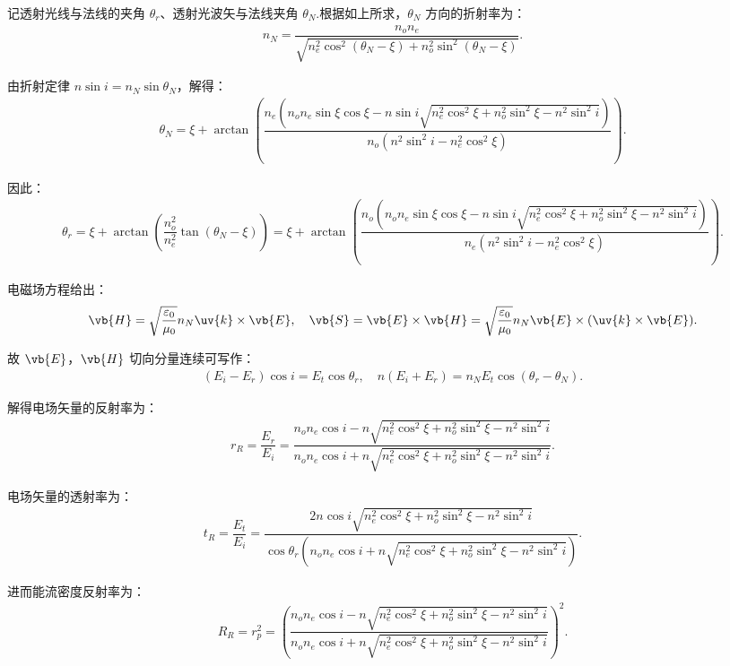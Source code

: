 记透射光线与法线的夹角 \(\theta_r\)、透射光波矢与法线夹角 \(\theta_N\).根据如上所求，\(\theta_N\) 方向的折射率为：
\begin{align*}
	n_N = \dfrac{n_o n_e}{\sqrt{n_e^2 \cos^2(\theta_N - \xi) + n_o^2 \sin^2(\theta_N - \xi)}}.
\end{align*}

由折射定律 \(n \sin i = n_N \sin \theta_N\)，解得：
\begin{align*}
	\theta_N = \xi + \arctan\left( \dfrac{n_e \left( n_o n_e \sin\xi \cos\xi - n \sin i \sqrt{n_e^2 \cos^2\xi + n_o^2 \sin^2\xi - n^2 \sin^2 i} \right)}{n_o \left( n^2 \sin^2 i - n_e^2 \cos^2\xi \right)} \right).
\end{align*}

因此：
\begin{align*}
	\theta_r = \xi + \arctan\left( \dfrac{n_o^2}{n_e^2} \tan(\theta_N - \xi) \right) = \xi + \arctan\left( \dfrac{n_o \left( n_o n_e \sin\xi \cos\xi - n \sin i \sqrt{n_e^2 \cos^2\xi + n_o^2 \sin^2\xi - n^2 \sin^2 i} \right)}{n_e \left( n^2 \sin^2 i - n_e^2 \cos^2\xi \right)} \right).
\end{align*}

电磁场方程给出：
\begin{align*}
	\vb{H} = \sqrt{\dfrac{\varepsilon_0}{\mu_0}} n_N \uv{k} \times \vb{E}, \quad \vb{S} = \vb{E} \times \vb{H} = \sqrt{\dfrac{\varepsilon_0}{\mu_0}} n_N \vb{E} \times (\uv{k} \times \vb{E}).
\end{align*}

故 \(\vb{E}\)，\(\vb{H}\) 切向分量连续可写作：
\begin{align*}
	(E_i - E_r) \cos i = E_t \cos\theta_r, \quad n (E_i + E_r) = n_N E_t \cos(\theta_r - \theta_N).
\end{align*}

解得电场矢量的反射率为：
\begin{align*}
	r_R = \dfrac{E_r}{E_i} = \dfrac{n_o n_e \cos i - n \sqrt{n_e^2 \cos^2\xi + n_o^2 \sin^2\xi - n^2 \sin^2 i}}{n_o n_e \cos i + n \sqrt{n_e^2 \cos^2\xi + n_o^2 \sin^2\xi - n^2 \sin^2 i}}.
\end{align*}

电场矢量的透射率为：
\begin{align*}
	t_R = \dfrac{E_t}{E_i} = \dfrac{2 n \cos i \sqrt{n_e^2 \cos^2\xi + n_o^2 \sin^2\xi - n^2 \sin^2 i}}{\cos\theta_r \left( n_o n_e \cos i + n \sqrt{n_e^2 \cos^2\xi + n_o^2 \sin^2\xi - n^2 \sin^2 i} \right)}.
\end{align*}

进而能流密度反射率为：
\begin{align*}
	R_R = r_p^2 = \left( \dfrac{n_o n_e \cos i - n \sqrt{n_e^2 \cos^2\xi + n_o^2 \sin^2\xi - n^2 \sin^2 i}}{n_o n_e \cos i + n \sqrt{n_e^2 \cos^2\xi + n_o^2 \sin^2\xi - n^2 \sin^2 i}} \right)^2.
\end{align*}

